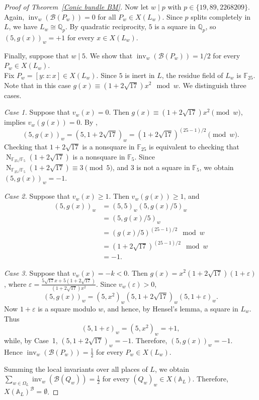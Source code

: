 \documentclass[10pt]{amsart}
\theoremstyle{plain}
\theoremstyle{definition}
\begin{document}
\begin{proof}[Proof of Theorem~\ref{Conic bundle BM}]
Now let \(w\mid p\) with
\(p\in\{19,89,2268209\}\). Again,
\(\operatorname{inv}_w(\mathcal{B}(P_w))=0\) for all
\(P_w\in X(L_w)\). Since \(p\) splits completely in \(L\), we have
\(L_w\cong\mathbb{Q}_p\). By quadratic reciprocity,
\(5\) is a square in \(\mathbb{Q}_p\), so \((5,g(x))_w=+1\) for every \(x\in X(L_w)\).

Finally, suppose that \(w\mid5\). We show that \(\operatorname{inv}_w(\mathcal{B}(P_w))
=1/2\) for every \(P_w\in X(L_w)\).\\
Fix \(P_w=[y:z:x]\in X(L_w)\). Since \(5\) is inert in \(L\), the residue field of \(L_w\) is \(\mathbb{F}_{25}\). Note that in this case \(g(x)\equiv(1+2\sqrt{17})x^2\mod w\). We distinguish three cases.

\noindent
\textit{Case 1.} Suppose that \(v_w(x)=0\). Then \(g(x)\equiv(1+2\sqrt{17})x^2\pmod w\), implies \(v_w(g(x))=0\). By \cite[Proposition~3.4]{Neu},
\[
(5,g(x))_w
=
(5,1+2\sqrt{17})_w
=
(1+2\sqrt{17})^{(25-1)/2}\pmod w.
\]
Checking that \(1+2\sqrt{17}\) is a nonsquare in \(\mathbb{F}_{25}\) is equivalent to checking that
\(\operatorname{N}_{\mathbb{F}_{25}/\mathbb{F}_5}(1+2\sqrt{17})\)
is a nonsquare in \(\mathbb{F}_5\). Since \(\operatorname{N}_{\mathbb{F}_{25}/\mathbb{F}_5}(1+2\sqrt{17})
\equiv3\pmod5\), and \(3\) is not a square in \(\mathbb{F}_5\), we obtain \((5,g(x))_w=-1\).

\noindent
\textit{Case 2.} Suppose that \(v_w(x)\ge1\). Then
\(v_w(g(x))\ge1\), and
\[
\begin{aligned}
(5,g(x))_w
&=(5,5)_w(5,g(x)/5)_w\\
&=(5,g(x)/5)_w
\\
&=(g(x)/5)^{(25-1)/2}\mod w\\
&=(1+2\sqrt{17})^{(25-1)/2}\mod w\\
&=-1.
\end{aligned}
\]

\noindent
\textit{Case 3.} Suppose that \(v_w(x)=-k<0\). Then \(g(x)
=
x^2(1+2\sqrt{17})(1+\varepsilon)\), where \(\varepsilon
=
\frac{5\sqrt{17}x+5(1+2\sqrt{17})}
{(1+2\sqrt{17})x^2}\). Since \(v_w(\varepsilon)>0\),
\[
(5,g(x))_w
=
(5,x^2)_w
(5,1+2\sqrt{17})_w
(5,1+\varepsilon)_w.
\]
Now \(1+\varepsilon\) is a square modulo \(w\), and hence, by Hensel's lemma, a square in \(L_w\). Thus
\[
(5,1+\varepsilon)_w=(5,x^2)_w=+1,
\]
while, by Case~1, \((5,1+2\sqrt{17})_w=-1\). Therefore, \((5,g(x))_w=-1\). \\
Hence \(\operatorname{inv}_w(\mathcal{B}(P_w))
=\frac12\) for every \(P_w\in X(L_w)\).

Summing the local invariants over all places of \(L\), we obtain \(\sum_{w\in\Omega_L}
\operatorname{inv}_w(\mathcal{B}(Q_w))
=
\frac12\) for every \((Q_w)_w\in X(\mathbb{A}_L)\). Therefore, \(X(\mathbb{A}_L)^{\mathcal{B}}
=\emptyset\).
\end{proof}
\end{document}
